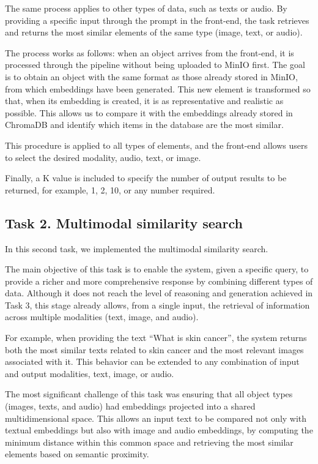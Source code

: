 \documentclass[12pt]{article}
\begin{document}
The same process applies to other types of data, such as texts or audio. By providing a specific input through the prompt in the front-end, the task retrieves and returns the most similar elements of the same type (image, text, or audio).

The process works as follows:
when an object arrives from the front-end, it is processed through the pipeline without being uploaded to MinIO first. The goal is to obtain an object with the same format as those already stored in MinIO, from which embeddings have been generated.
This new element is transformed so that, when its embedding is created, it is as representative and realistic as possible. This allows us to compare it with the embeddings already stored in ChromaDB and identify which items in the database are the most similar.

This procedure is applied to all types of elements, and the front-end allows users to select the desired modality, audio, text, or image.

Finally, a K value is included to specify the number of output results to be returned, for example, 1, 2, 10, or any number required.
\subsection{Task 2. Multimodal similarity search}
In this second task, we implemented the multimodal similarity search.

The main objective of this task is to enable the system, given a specific query, to provide a richer and more comprehensive response by combining different types of data.
Although it does not reach the level of reasoning and generation achieved in Task 3, this stage already allows, from a single input, the retrieval of information across multiple modalities (text, image, and audio).

For example, when providing the text “What is skin cancer”, the system returns both the most similar texts related to skin cancer and the most relevant images associated with it. This behavior can be extended to any combination of input and output modalities, text, image, or audio.

The most significant challenge of this task was ensuring that all object types (images, texts, and audio) had embeddings projected into a shared multidimensional space.
This allows an input text to be compared not only with textual embeddings but also with image and audio embeddings, by computing the minimum distance within this common space and retrieving the most similar elements based on semantic proximity.
\end{document}
